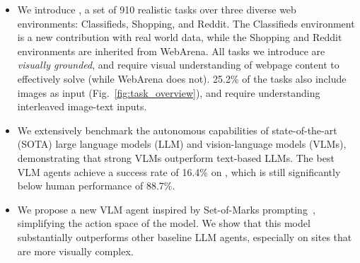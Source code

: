 \begin{itemize}
    \item We introduce \BenchmarkName{}, a set of 910 realistic tasks over three diverse web environments: Classifieds, Shopping, and Reddit. The Classifieds environment is a new contribution with real world data, while the Shopping and Reddit environments are inherited from WebArena. All tasks we introduce are \textit{visually grounded}, and require visual understanding of webpage content to effectively solve (while WebArena does not). 25.2\% of the tasks also include images as input (Fig.~\ref{fig:task_overview}), and require understanding interleaved image-text inputs. %
    \item We extensively benchmark the autonomous capabilities of state-of-the-art (SOTA) large language models (LLM) and vision-language models (VLMs), demonstrating that strong VLMs outperform text-based LLMs. The best VLM agents achieve a success rate of 16.4\% on \BenchmarkName{}, which is still significantly below human performance of 88.7\%. %
    \item We propose a new VLM agent inspired by Set-of-Marks prompting~\cite{yang2023som}, simplifying the action space of the model. We show that this model substantially outperforms other baseline LLM agents, especially on sites that are more visually complex.
\end{itemize}

